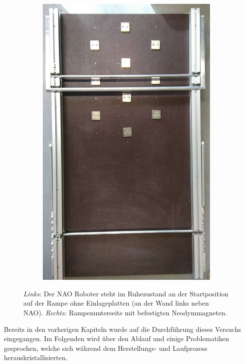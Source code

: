 \begin{figure}[htb]
\begin{subfigure}[c]{0.4\linewidth}
	\end{subfigure}
	\hfill
	\begin{subfigure}[c]{0.4315\linewidth}
		\centering
		\includegraphics[width=\linewidth]{Bilder/magneten_an_rampe1_geschnitten.jpg}
	\end{subfigure}
	\hfill
	\caption{\textit{Links:} Der NAO Roboter steht im Ruhezustand an der Startposition auf der Rampe ohne Einlageplatten (an der Wand links neben NAO). \textit{Rechts:} Rampenunterseite mit befestigten Neodymmagneten.}
	\label{nao_und_rampe}
\end{figure}

Bereits in den vorherigen Kapiteln wurde auf die Durchführung dieses Versuchs eingegangen. Im Folgenden wird über den Ablauf und einige Problematiken gesprochen, welche sich während dem Herstellungs- und Laufprozess herauskristallisierten. 

